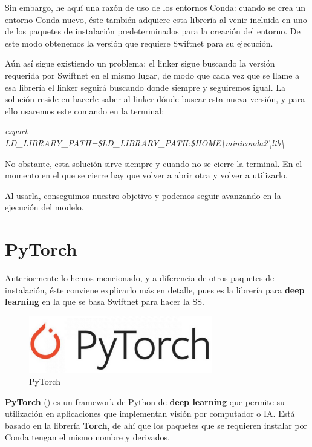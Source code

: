 Sin embargo, he aquí una razón de uso de los entornos Conda: cuando se crea un entorno Conda nuevo, éste también adquiere esta librería al venir incluida en uno de los paquetes de instalación predeterminados para la creación del entorno. De este modo obtenemos la versión que requiere Swiftnet para su ejecución.

Aún así sigue existiendo un problema: el linker sigue buscando la versión requerida por Swiftnet en el mismo lugar, de modo que cada vez que se llame a esa librería el linker seguirá buscando donde siempre y seguiremos igual. La solución reside en hacerle saber al linker dónde buscar esta nueva versión, y para ello usaremos este comando en la terminal:

\begin{center}
\textit{export LD\_LIBRARY\_PATH=\$LD\_LIBRARY\_PATH:\$HOME\textbackslash{miniconda2}\textbackslash{lib}\textbackslash{}}
\end{center}

No obstante, esta solución sirve siempre y cuando no se cierre la terminal. En el momento en el que se cierre hay que volver a abrir otra y volver a utilizarlo.

Al usarla, conseguimos nuestro objetivo y podemos seguir avanzando en la ejecución del modelo.

\section{PyTorch}

Anteriormente lo hemos mencionado, y a diferencia de otros paquetes de instalación, éste conviene explicarlo más en detalle, pues es la librería para \textbf{deep learning} en la que se basa Swiftnet para hacer la \ac{SS}.

\begin{figure}[H]
  \centering
  \includegraphics[width=8cm]{Figuras/PyTorch.eps}
  \caption{PyTorch}
\end{figure}

\textbf{PyTorch} (\cite{pytorch}) es un framework de Python de \textbf{deep learning} que permite su utilización en aplicaciones que implementan visión por computador o IA. Está basado en la librería \textbf{Torch}, de ahí que los paquetes que se requieren instalar por Conda tengan el mismo nombre y derivados.

